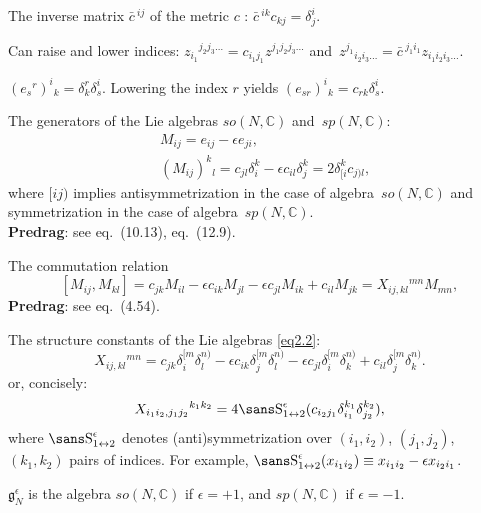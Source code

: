 \begin{description}
The inverse matrix $\bar{c}\,^{ij}$ of the metric $c$ :
$\bar{c}\,^{ik}c_{kj}=\delta^i_j$.

Can raise and lower indices:
$z_{i_1}{}^{j_2j_3\dots}=c_{i_1j_1}z^{j_1j_2j_3\dots}$
and~$z^{j_1}{}_{i_2i_3\dots}=\bar{c}\,^{j_1i_1}z_{i_1i_2i_3\dots}$.

$(e_s{}^r)^i{}_k=\delta^r_k\delta^i_s$.
Lowering the index $r$ yields
$(e_{sr})^i{}_k=c_{rk}\delta^i_s$.

The generators of the
Lie algebras $so(N,\mathbb{C})$ and~$sp(N,\mathbb{C})$:
\begin{align}
\label{eq2.2}
&M_{ij}=e_{ij}-\epsilon e_{ji},\\
&(M_{ij})^k{}_l=c_{jl}\delta^k_i-\epsilon c_{il}\delta^k_j=2\delta_{[i}^kc_{j)l},
\label{eq2.3}
\end{align}
where $[ij)$ implies antisymmetrization in the case of
algebra~$so(N,\mathbb{C})$ and symmetrization in the case of
algebra~$sp(N,\mathbb{C})$.
\\{\bf Predrag}: see
 {eq.~(10.13)},
 {eq.~(12.9)}.


The commutation relation
\begin{equation}
\label{eq2.4}
[M_{ij},M_{kl}]=c_{jk}M_{il}-\epsilon c_{ik}M_{jl}-\epsilon c_{jl}M_{ik}+c_{il}M_{jk}=X_{ij,kl}{}^{mn}M_{mn},
\end{equation}
{\bf Predrag}: see
 {eq.~(4.54)}.

The structure constants of the Lie algebras \eqref{eq2.2}:
\begin{equation}
\label{eq2.5}
X_{ij,kl}{}^{mn}=c_{jk}\delta_{i}^{[m}\delta_{l}^{n)}-\epsilon c_{ik}\delta_{j}^{[m}\delta_{l}^{n)}-\epsilon c_{jl}\delta_{i}^{[m}\delta_{k}^{n)}+c_{il}\delta_{j}^{[m}\delta_{k}^{n)}.
\end{equation}
or, concisely:
\begin{equation}
\label{eq2.6}
X_{i_1i_2,j_1j_2}{}^{k_1k_2}
=4\Sym^\epsilon_{1\leftrightarrow 2}(c_{i_2j_1}\delta_{i_1}^{k_1}\delta_{j_2}^{k_2}),
\end{equation}
where $\Sym^\epsilon_{1\leftrightarrow 2}$ denotes (anti)symmetrization over
$(i_1,i_2)$, $(j_1,j_2)$, $(k_1,k_2)$ pairs of indices. For example,
 $\Sym^\epsilon_{1\leftrightarrow 2}(x_{i_1 i_2}) \equiv
 x_{i_1 i_2} - \epsilon x_{i_2 i_1}$.

$\mathfrak{g}_N^\epsilon$ is the algebra $so(N,\mathbb{C})$ if $\epsilon=+1$,
 and $sp(N,\mathbb{C})$ if $\epsilon=-1$.



\end{description}
